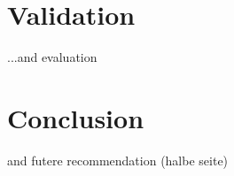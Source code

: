 \documentclass[5p,times,procedia]{elsarticle}
\newenvironment{note}{%
	\noindent
    \color{notecolor}%
}{%
    \par\medskip%
}
\begin{document}
 
\section{Validation}
\begin{note}
	...and evaluation

\end{note}
\section{Conclusion}
\begin{note}
	and futere recommendation (halbe seite)
	
\end{note}





\end{document}
